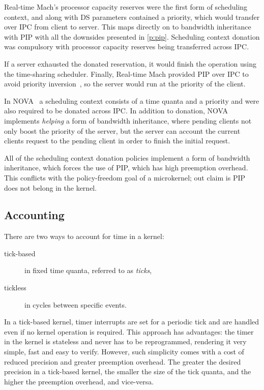 Real-time Mach's processor capacity reserves were the first form of scheduling context, and along
with \gls{DS} parameters contained a priority, which would transfer over \gls{IPC} from
client to server. This maps directly on to bandwidth inheritance with \gls{PIP} with all the
downsides presented in \cref{p:pip}. Scheduling context donation was compulsory with processor
capacity reserves being transferred across \gls{IPC}.

If a server exhausted the
donated reservation, it would finish the operation using the time-sharing scheduler.  Finally,
Real-time Mach provided \gls{PIP} over \gls{IPC} to avoid priority inversion~\citep{Tokuda_NR_90},
so the server would run at the priority of the client.

In NOVA~\citep{Steinberg_WH_05} a scheduling context consists of a time quanta and a priority
and were also required to be donated across \gls{IPC}. In addition to donation, NOVA implements
\emph{helping} a form of bandwidth inheritance, where pending clients not only boost the priority of
the server, but the server can account the current clients request to the pending client in order to
finish the initial request. 

All of the scheduling context donation policies implement a form of bandwidth inheritance, which
forces the use of \gls{PIP}, which has high preemption overhead. This conflicts with the
policy-freedom goal of a microkernel; out claim is \gls{PIP} does not belong in the kernel. 

\subsection{Accounting}
\label{s:tick-v-tickless}

There are two ways to account for time in a kernel:  
\begin{description}
    \item[tick-based] in fixed time quanta, referred to as \emph{ticks},
    \item[tickless] in cycles between specific events. 
\end{description}

In a tick-based kernel, timer interrupts are set for a periodic tick and are handled even if no
kernel operation is required.
This approach has advantages: the timer in the kernel is stateless and never has to be
reprogrammed, rendering it very simple, fast and easy to verify.
However, such simplicity comes with a cost of reduced precision and greater preemption
overhead.
The greater the desired precision in a tick-based kernel, the smaller the size of the tick quanta,
and the higher the preemption overhead, and vice-versa.


